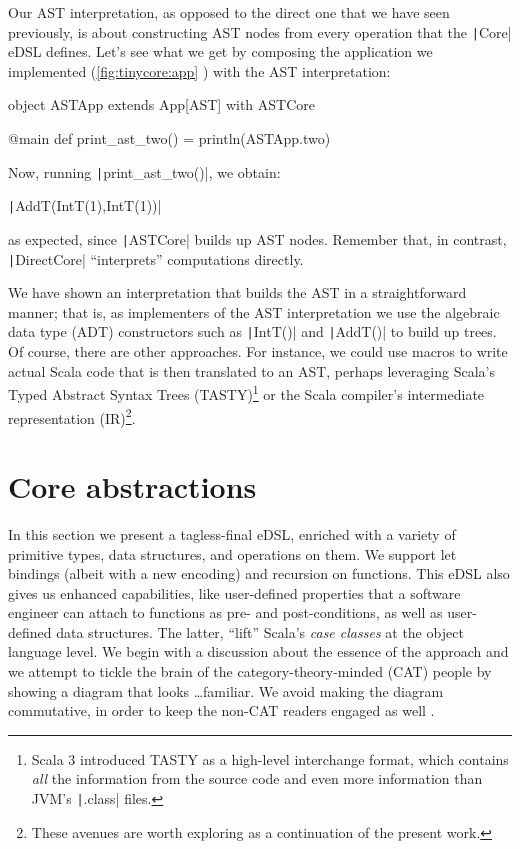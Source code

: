 \documentclass[11pt]{article}
\renewcommand{\vref}[1]{\autoref{#1} \vpageref{#1}}{}
\newcommand{\ScalaI}[1]{\texttt|#1|}
\newcommand{\TextI}[1]{\texttt|#1|}
\begin{document}
Our AST interpretation, as opposed to the direct one that we have seen 
previously, is about constructing AST nodes from every operation that the 
\ScalaI{Core} eDSL defines. Let's see what we get by composing the 
application we implemented (\vref{fig:tinycore:app}) with the AST 
interpretation:

\begin{ScalaBlockSimple}
object ASTApp extends App[AST] with ASTCore

@main def print_ast_two() = println(ASTApp.two)
\end{ScalaBlockSimple}

\noindent Now, running \ScalaI{print_ast_two()}, we obtain:

\par\ScalaI{AddT(IntT(1),IntT(1))}

\noindent as expected, since \ScalaI{ASTCore} builds up AST nodes. Remember 
that, in contrast, \ScalaI{DirectCore} ``interprets'' computations directly.

We have shown an interpretation that builds the AST in a straightforward 
manner; that is, as implementers of the AST interpretation we use the 
algebraic data type (ADT) constructors  such as \ScalaI{IntT()} and 
\ScalaI{AddT()} to build up trees. Of course, there are other approaches. For 
instance, we could use macros to write actual Scala code that is then 
translated to an AST, perhaps leveraging Scala's Typed Abstract Syntax Trees 
(TASTY)\footnote{Scala 3 introduced TASTY as a high-level interchange format, 
which contains \textit{all} the information from the source code and even 
more information than JVM's \TextI{.class} files.} or the Scala compiler's 
intermediate representation (IR)\footnote{These avenues are worth exploring 
as a continuation of the present work.}.


\section{Core abstractions}
\label{sec:core}
\begin{tcolorbox}
\faAngleDoubleRight{ } In this section we present a tagless-final eDSL, 
enriched with a variety of primitive types, data structures, and operations 
on them. We support let bindings (albeit with a new encoding) and recursion 
on functions. This eDSL also gives us enhanced capabilities, like 
user-defined properties that a software engineer can attach to functions as 
pre- and post-conditions, as well as user-defined data structures. The 
latter, ``lift'' Scala's \textit{case classes} at the object language level. 
We begin with a discussion about the essence of the approach and we attempt 
to tickle the brain of the category-theory-minded (CAT) people by showing%
{ } a diagram that looks \dots familiar. We avoid making the diagram 
commutative, in order to keep the non-CAT readers engaged as well%
.
\end{tcolorbox}
\end{document}
